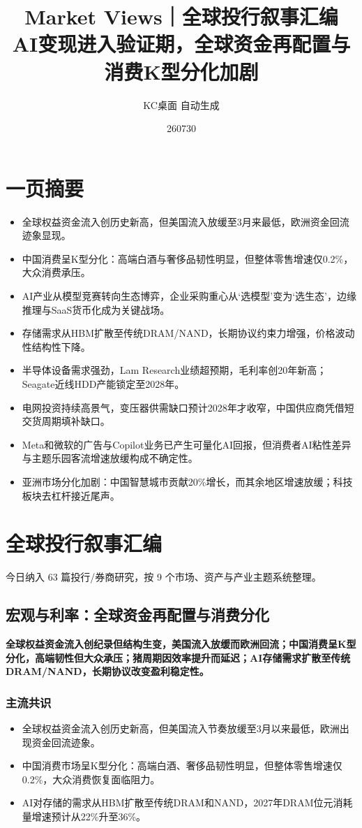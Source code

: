 \documentclass[11pt]{ctexart}
\title{\textbf{Market Views｜全球投行叙事汇编}\\[0.4em]{\large AI变现进入验证期，全球资金再配置与消费K型分化加剧}}
\author{KC桌面 自动生成}
\date{260730}
\begin{document}
\maketitle
\tableofcontents
\newpage
\section{一页摘要}
\begin{itemize}
  \item 全球权益资金流入创历史新高，但美国流入放缓至3月来最低，欧洲资金回流迹象显现。
  \item 中国消费呈K型分化：高端白酒与奢侈品韧性明显，但整体零售增速仅0.2\%，大众消费承压。
  \item AI产业从模型竞赛转向生态博弈，企业采购重心从‘选模型’变为‘选生态’，边缘推理与SaaS货币化成为关键战场。
  \item 存储需求从HBM扩散至传统DRAM/NAND，长期协议约束力增强，价格波动性结构性下降。
  \item 半导体设备需求强劲，Lam Research业绩超预期，毛利率创20年新高；Seagate近线HDD产能锁定至2028年。
  \item 电网投资持续高景气，变压器供需缺口预计2028年才收窄，中国供应商凭借短交货周期填补缺口。
  \item Meta和微软的广告与Copilot业务已产生可量化AI回报，但消费者AI粘性差异与主题乐园客流增速放缓构成不确定性。
  \item 亚洲市场分化加剧：中国智慧城市贡献20\%增长，而其余地区增速放缓；科技板块去杠杆接近尾声。
\end{itemize}
\section{全球投行叙事汇编}
今日纳入 63 篇投行/券商研究，按 9 个市场、资产与产业主题系统整理。
\newpage
\subsection{宏观与利率：全球资金再配置与消费分化}
\textbf{全球权益资金流入创纪录但结构生变，美国流入放缓而欧洲回流；中国消费呈K型分化，高端韧性但大众承压；猪周期因效率提升而延迟；AI存储需求扩散至传统DRAM/NAND，长期协议改变盈利稳定性。}
\subsubsection*{主流共识}
\begin{itemize}
  \item 全球权益资金流入创历史新高，但美国流入节奏放缓至3月以来最低，欧洲出现资金回流迹象。
  \item 中国消费市场呈K型分化：高端白酒、奢侈品韧性明显，但整体零售增速仅0.2\%，大众消费恢复面临阻力。
  \item AI对存储的需求从HBM扩散至传统DRAM和NAND，2027年DRAM位元消耗量增速预计从22\%升至36\%。
\end{itemize}
\end{document}
